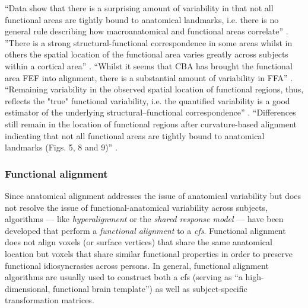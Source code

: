 %
``Data show that there is a surprising amount of variability in that not all
functional areas are tightly bound to anatomical landmarks, i.e. there is no
general rule describing how macroanatomical and functional areas correlate''
\citep{frost2012measuring}.
%
''There is a strong structural-functional correspondence in some areas whilst in
others the spatial location of the functional area varies greatly across
subjects within a cortical area'' \citep{frost2012measuring}.
%
``Whilst it seems that CBA has brought the functional area FEF into alignment,
there is a substantial amount of variability in FFA''
\citep{frost2012measuring}.
%
``Remaining variability in the observed spatial location of functional regions,
thus, reflects the "true" functional variability, i.e. the quantified
variability is a good estimator of the underlying structural–functional
correspondence'' \citep{frost2012measuring}.
%
``Differences still remain in the location of functional regions after
curvature-based alignment indicating that not all functional areas are tightly
bound to anatomical landmarks (Figs. 5, 8 and 9)'' \citep{frost2012measuring}.



\subsubsection{Functional alignment}





Since anatomical alignment addresses the issue of anatomical variability but
does not resolve the issue of functional-anatomical variability across subjects,
algorithms --- like \textit{hyperalignment} \citep{haxby2011common,
guntupalli2016model} or the \textit{shared response model}
\citep{chen2015reduced, zhang2016searchlight} --- have been developed that
perform a \textit{functional alignment} to a \textit{\ac{cfs}}.
%
Functional alignment does not align voxels (or surface vertices) that share the
same anatomical location but voxels that share similar functional properties in
order to preserve functional idiosyncrasies across persons.
%
In general, functional alignment algorithms are usually used to construct both a
\ac{cfs} (serving as ``a high-dimensional, functional brain template'') as well
as subject-specific transformation matrices.


